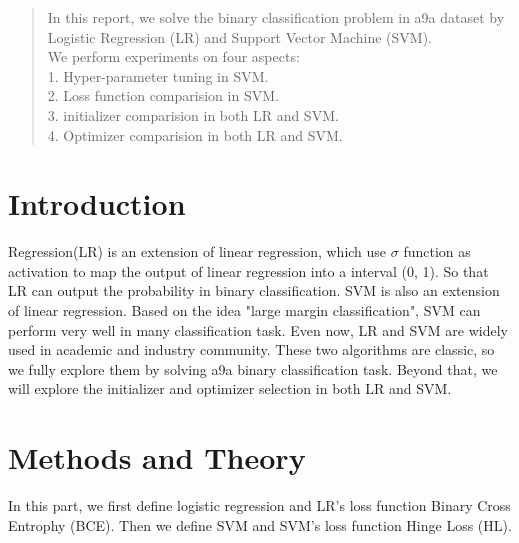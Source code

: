 \documentclass[journal, a4paper]{IEEEtran}
\begin{document}
\begin{abstract}
In this report, we solve the binary classification problem in a9a dataset by Logistic Regression (LR) and Support Vector Machine (SVM). \\
We perform experiments on four aspects: \\
1. Hyper-parameter tuning in SVM. \\
2. Loss function comparision in SVM. \\
3. initializer comparision in both LR and SVM. \\
4. Optimizer comparision in both LR and SVM. \\
\end{abstract}

\section{Introduction}
 Regression(LR) is an extension of linear regression, which use $\sigma$ function as activation to map the output of linear regression into a interval (0, 1). So that LR can output the probability in binary classification. SVM is also an extension of linear regression. Based on the idea "large margin classification", SVM can perform very well in many classification task. Even now, LR and SVM are widely used in academic and industry community. These two algorithms are classic, so we fully explore them by solving a9a binary classification task. Beyond that, we will explore the initializer and optimizer selection in both LR and SVM. 

\section{Methods and Theory}
In this part, we first define logistic regression and LR's loss function Binary Cross Entrophy (BCE). Then we define SVM and SVM's loss function Hinge Loss (HL).
\end{document}
